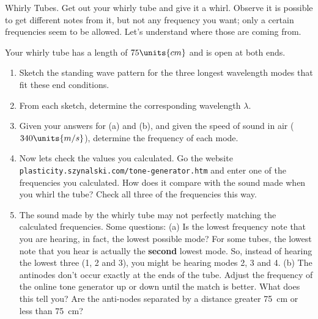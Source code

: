 \begin{aproblem}{Whirly Tubes.}  
  Get out your whirly tube and give it a whirl.  Observe it is
  possible to get different notes from it, but not any frequency you
  want; only a certain frequencies seem to be allowed.  Let's
  understand where those are coming from.
  \smallskip

  Your whirly tube has a length of $75\units{cm}$ and is open at both ends.
  \begin{enumerate}
  \item Sketch the standing wave pattern for the three longest
    wavelength modes that fit these end conditions.
  \item From each sketch, determine the corresponding wavelength
    $\lambda$.
  \item Given your answers for (a) and (b), and given the speed of
    sound in air ($340\units{m/s}$), determine the frequency of each
    mode.
  \item Now lets check the values you calculated.  Go the
    website\\ \texttt{plasticity.szynalski.com/tone-generator.htm} and
    enter one of the frequencies you calculated.  How does it compare
    with the sound made when you whirl the tube?  Check all three of
    the frequencies this way.
  \item The sound made by the whirly tube may not perfectly matching
    the calculated frequencies. Some questions: (a) Is the lowest
    frequency note that you are hearing, in fact, the lowest possible
    mode? For some tubes, the lowest note that you hear is actually
    the {\bf second} lowest mode. So, instead of hearing the lowest
    three (1, 2 and 3), you might be hearing modes 2, 3 and 4.  (b)
    The antinodes don't occur exactly at the ends of the tube.  Adjust
    the frequency of the online tone generator up or down until the
    match is better.  What does this tell you?  Are the anti-nodes
    separated by a distance greater 75~cm or less than 75~cm?
  \end{enumerate}
  \label{prob:whirly_tube}
\end{aproblem}
